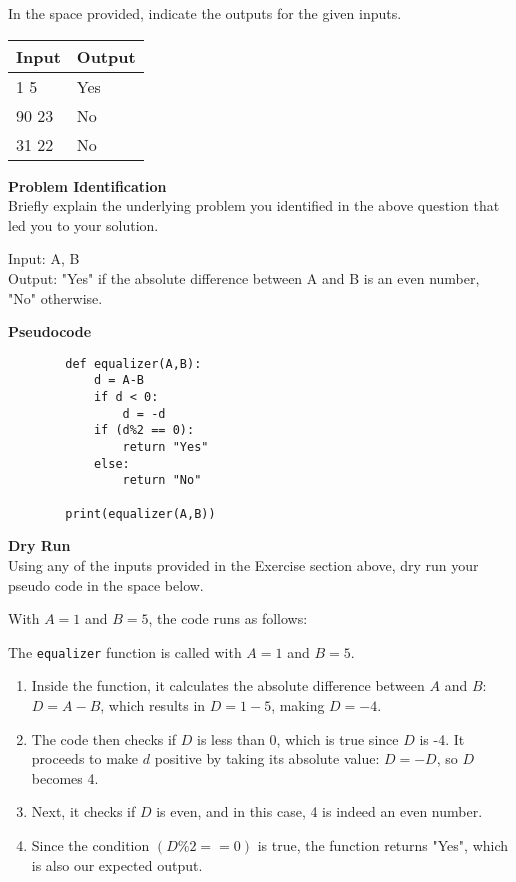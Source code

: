 \documentclass[a4paper]{exam}
\newcommand\heading[1]{\textbf{#1}}
\begin{document}
\begin{questions}
    In the space provided, indicate the outputs for the given inputs.

    \begin{tabularx}{\textwidth}{|X|X|}
        \rowcolor{gray!50}
        \hline
        Input & Output \\ \hline\hline
        1 5   & Yes    \\\hline
        90 23 & No     \\\hline
        31 22 & No     \\\hline
    \end{tabularx}

    \heading{Problem Identification}\\
    Briefly explain the underlying problem you identified in the above question that led you to your solution.

    Input: A, B \\
    Output: "Yes" if the absolute difference between A and B is an even number, "No" otherwise.


    \heading{Pseudocode}
    \begin{verbatim}
        def equalizer(A,B):
            d = A-B
            if d < 0:
                d = -d 
            if (d%2 == 0):
                return "Yes"
            else:
                return "No"
        
        print(equalizer(A,B))

    \end{verbatim}

    
    \heading{Dry Run}\\
    Using any of the inputs provided in the Exercise section above, dry run your pseudo code in the space below.


With $A=1$ and $B=5$, the code runs as follows:

The \texttt{equalizer} function is called with $A=1$ and $B=5$.

\begin{enumerate}
    \item Inside the function, it calculates the absolute difference between $A$ and $B$: $D = A - B$, which results in $D = 1 - 5$, making $D = -4$.
    \item The code then checks if $D$ is less than 0, which is true since $D$ is -4. It proceeds to make $d$ positive by taking its absolute value: $D = -D$, so $D$ becomes 4. 
    \item Next, it checks if $D$ is even, and in this case, 4 is indeed an even number.
    \item Since the condition $(D \% 2 == 0)$ is true, the function returns "Yes", which is also our expected output.
    

\end{enumerate}
\end{questions}
\end{document}
